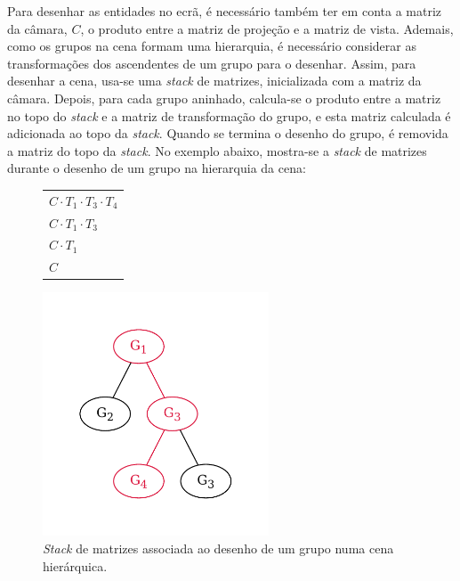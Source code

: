 \documentclass[12pt, a4paper]{article}
\begin{document}
Para desenhar as entidades no ecrã, é necessário também ter em conta a matriz da câmara, $C$, o
produto entre a matriz de projeção e a matriz de vista. Ademais, como os grupos na cena formam uma
hierarquia, é necessário considerar as transformações dos ascendentes de um grupo para o desenhar.
Assim, para desenhar a cena, usa-se uma \emph{stack} de matrizes, inicializada com a matriz da
câmara. Depois, para cada grupo aninhado, calcula-se o produto entre a matriz no topo do
\emph{stack} e a matriz de transformação do grupo, e esta matriz calculada é adicionada ao topo da
\emph{stack}. Quando se termina o desenho do grupo, é removida a matriz do topo da \emph{stack}. No
exemplo abaixo, mostra-se a \emph{stack} de matrizes durante o desenho de um grupo na hierarquia da
cena:

\begin{figure}[h]
    \begin{minipage}{0.5\textwidth}
        \centering
        \begin{tabular}{|>{\centering\arraybackslash}m{3cm}|}
            \hline \\
            \hline $C \cdot T_1 \cdot T_3 \cdot T_4$ \\
            \hline $C \cdot T_1 \cdot T_3$ \\
            \hline $C \cdot T_1$ \\
            \hline $C$ \\
            \hline
        \end{tabular}
    \end{minipage}
    \begin{minipage}{0.5\textwidth}
        \centering
        \includegraphics[width=0.6\textwidth]{res/phase2/SceneGraph.pdf}
    \end{minipage}
    \caption{\emph{Stack} de matrizes associada ao desenho de um grupo numa cena hierárquica.}
\end{figure}
\end{document}
